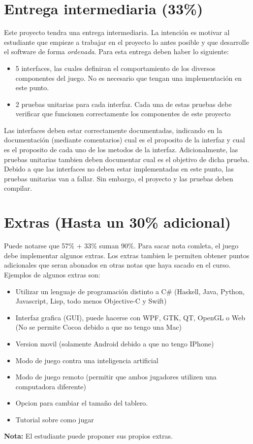 \documentclass{article}
\begin{document}
\section*{Entrega intermediaria (33\%)}
Este proyecto tendra una entrega intermediaria. La intenci\'on es
motivar al estudiante que empieze a trabajar en el proyecto lo antes
posible y que desarrolle el software de forma \emph{ordenada}. Para
esta entrega deben haber lo siguiente:
\begin{itemize}
        \item{5 interfaces, las cuales definiran el comportamiento
        de los diversos componentes del juego. No es necesario que
        tengan una implementaci\'on en este punto.}
        \item{2 pruebas unitarias para cada interfaz. Cada una de
        estas pruebas debe verificar que funcionen correctamente
        los componentes de este proyecto}
\end{itemize}
Las interfaces deben estar correctamente documentadas, indicando
en la documentaci\'on (mediante comentarios) cual es el proposito
de la interfaz y cual es el proposito de cada uno de los metodos
de la interfaz. Adicionalmente, las pruebas unitarias tambien deben
documentar cual es el objetivo de dicha prueba. Debido a que las
interfaces no deben estar implementadas en este punto, las pruebas
unitarias van a fallar. Sin embargo, el proyecto y las pruebas deben
compilar.

\section*{Extras (Hasta un 30\% adicional)}
Puede notarse que 57\% + 33\% suman 90\%. Para sacar nota comleta,
el juego debe implementar algunos extras. Los extras tambien le
permiten obtener puntos adicionales que seran abonados en otras
notas que haya sacado en el curso. Ejemplos de algunos extras son:
\begin{itemize}
        \item{Utilizar un lenguaje de programaci\'on distinto a C\#
        (Haskell, Java, Python, Javascript, Lisp, todo menos Objective-C y Swift)}
        \item{Interfaz grafica (GUI), puede hacerse con WPF, GTK, QT, OpenGL o Web
        (No se permite Cocoa debido a que no tengo una Mac)}
        \item{Version movil (solamente Android debido a que no tengo IPhone)}
        \item{Modo de juego contra una inteligencia artificial}
        \item{Modo de juego remoto (permitir que ambos jugadores
        utilizen una computadora diferente)}
        \item{Opcion para cambiar el tama\~no del tablero.}
        \item{Tutorial sobre como jugar}
\end{itemize}
{\bf Nota:} El estudiante puede proponer sus propios extras.
\end{document}
